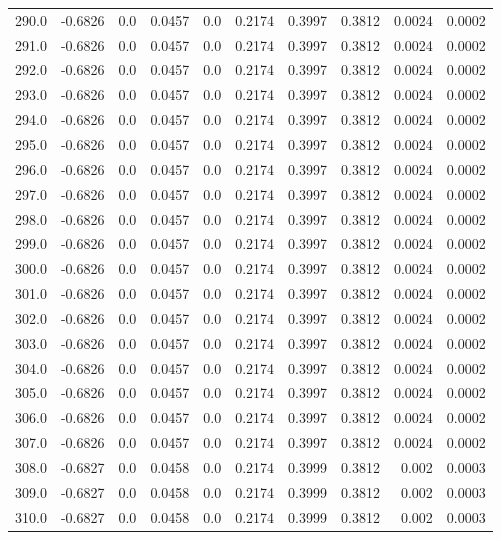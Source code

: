 \begin{longtable}{lrrrrrrrrr}
290.0 & -0.6826 & 0.0 & 0.0457 & 0.0 & 0.2174 & 0.3997 & 0.3812 & 0.0024 & 0.0002 \\
291.0 & -0.6826 & 0.0 & 0.0457 & 0.0 & 0.2174 & 0.3997 & 0.3812 & 0.0024 & 0.0002 \\
292.0 & -0.6826 & 0.0 & 0.0457 & 0.0 & 0.2174 & 0.3997 & 0.3812 & 0.0024 & 0.0002 \\
293.0 & -0.6826 & 0.0 & 0.0457 & 0.0 & 0.2174 & 0.3997 & 0.3812 & 0.0024 & 0.0002 \\
294.0 & -0.6826 & 0.0 & 0.0457 & 0.0 & 0.2174 & 0.3997 & 0.3812 & 0.0024 & 0.0002 \\
295.0 & -0.6826 & 0.0 & 0.0457 & 0.0 & 0.2174 & 0.3997 & 0.3812 & 0.0024 & 0.0002 \\
296.0 & -0.6826 & 0.0 & 0.0457 & 0.0 & 0.2174 & 0.3997 & 0.3812 & 0.0024 & 0.0002 \\
297.0 & -0.6826 & 0.0 & 0.0457 & 0.0 & 0.2174 & 0.3997 & 0.3812 & 0.0024 & 0.0002 \\
298.0 & -0.6826 & 0.0 & 0.0457 & 0.0 & 0.2174 & 0.3997 & 0.3812 & 0.0024 & 0.0002 \\
299.0 & -0.6826 & 0.0 & 0.0457 & 0.0 & 0.2174 & 0.3997 & 0.3812 & 0.0024 & 0.0002 \\
300.0 & -0.6826 & 0.0 & 0.0457 & 0.0 & 0.2174 & 0.3997 & 0.3812 & 0.0024 & 0.0002 \\
301.0 & -0.6826 & 0.0 & 0.0457 & 0.0 & 0.2174 & 0.3997 & 0.3812 & 0.0024 & 0.0002 \\
302.0 & -0.6826 & 0.0 & 0.0457 & 0.0 & 0.2174 & 0.3997 & 0.3812 & 0.0024 & 0.0002 \\
303.0 & -0.6826 & 0.0 & 0.0457 & 0.0 & 0.2174 & 0.3997 & 0.3812 & 0.0024 & 0.0002 \\
304.0 & -0.6826 & 0.0 & 0.0457 & 0.0 & 0.2174 & 0.3997 & 0.3812 & 0.0024 & 0.0002 \\
305.0 & -0.6826 & 0.0 & 0.0457 & 0.0 & 0.2174 & 0.3997 & 0.3812 & 0.0024 & 0.0002 \\
306.0 & -0.6826 & 0.0 & 0.0457 & 0.0 & 0.2174 & 0.3997 & 0.3812 & 0.0024 & 0.0002 \\
307.0 & -0.6826 & 0.0 & 0.0457 & 0.0 & 0.2174 & 0.3997 & 0.3812 & 0.0024 & 0.0002 \\
308.0 & -0.6827 & 0.0 & 0.0458 & 0.0 & 0.2174 & 0.3999 & 0.3812 & 0.002 & 0.0003 \\
309.0 & -0.6827 & 0.0 & 0.0458 & 0.0 & 0.2174 & 0.3999 & 0.3812 & 0.002 & 0.0003 \\
310.0 & -0.6827 & 0.0 & 0.0458 & 0.0 & 0.2174 & 0.3999 & 0.3812 & 0.002 & 0.0003 \\

\end{longtable}

